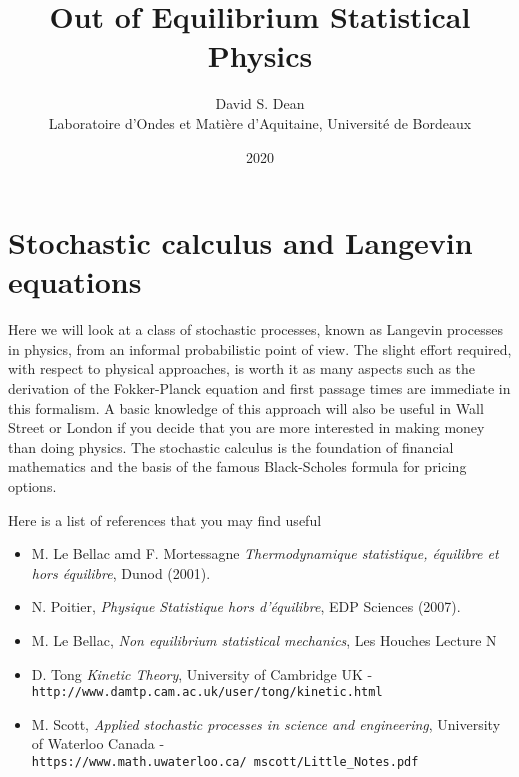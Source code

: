 \documentclass[11pt]{report}
\begin{document}
\title{Out of Equilibrium Statistical Physics}
\author{David S. Dean \\ Laboratoire d'Ondes et Mati\`ere d'Aquitaine, Universit\'e de Bordeaux}
\date{2020}                                           
\maketitle
\tableofcontents

\chapter{Stochastic calculus and Langevin equations}
Here we will look at a class of stochastic processes, known as Langevin processes in physics, from an informal probabilistic point of view. The slight effort required, with respect to physical approaches, is worth it as many aspects such as the derivation of the Fokker-Planck equation and first passage times are immediate in this formalism. A basic knowledge of this approach will also be useful in Wall Street or London if you decide that you are more interested in making money than doing physics. The stochastic calculus is the foundation of financial mathematics and the basis of the famous Black-Scholes formula for pricing options.

Here is a list of references that you may find useful


\begin{itemize}
\item M. Le Bellac amd  F. Mortessagne {\em Thermodynamique statistique, \'equilibre et hors \'equilibre}, Dunod (2001).
\item N. Poitier, {\em Physique Statistique hors d'\'equilibre}, EDP Sciences (2007).
\end{itemize}

\begin{itemize}
\item M. Le Bellac, {\em Non equilibrium statistical mechanics}, Les Houches Lecture N
\item D. Tong {\em Kinetic Theory},  University of Cambridge UK -\\ {\tt http://www.damtp.cam.ac.uk/user/tong/kinetic.html}
\item M. Scott, {\em Applied stochastic processes in science and engineering}, University of Waterloo Canada - {\tt https://www.math.uwaterloo.ca/~mscott/Little\_Notes.pdf}
\end{itemize}
\end{document}
